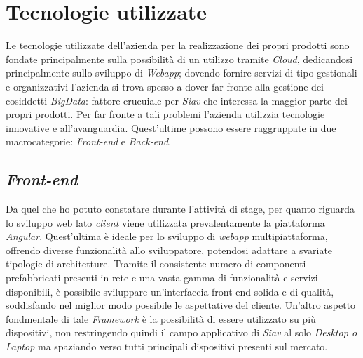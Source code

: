 \section {Tecnologie utilizzate}
Le tecnologie utilizzate dell'azienda per la realizzazione dei propri prodotti sono fondate principalmente sulla possibilità di un utilizzo tramite \textit{\gls{Cloud}}, dedicandosi principalmente sullo sviluppo di \textit{Webapp}; dovendo fornire servizi di tipo gestionali e organizzativi l'azienda si trova spesso a dover far fronte alla gestione dei cosiddetti \textit{\gls{BigData}}: fattore crucuiale per \textit{Siav} che interessa la maggior parte dei propri prodotti. Per far fronte a tali problemi l'azienda utilizzia tecnologie innovative e all'avanguardia. Quest'ultime possono essere raggruppate in due macrocategorie: \textit{Front-end} e \textit{Back-end}.
\subsection{\textit{Front-end}}
Da quel che ho potuto constatare durante l'attività di stage, per quanto riguarda lo sviluppo web lato \textit{client} viene utilizzata prevalentamente la piattaforma \textit{\gls{Angular}}.
Quest'ultima è ideale per lo sviluppo di \textit{webapp} multipiattaforma, offrendo diverse funzionalità allo sviluppatore, potendosi adattare a svariate tipologie di architetture.
 Tramite il consistente numero di componenti prefabbricati presenti in rete e una vasta gamma di funzionalità e servizi disponibili, è possibile sviluppare un'interfaccia front-end solida e di qualità, soddisfando nel miglior modo possibile le aspettative del cliente. Un'altro aspetto fondmentale di tale \textit{\gls{Framework}} è la possibilità di essere utilizzato su più dispositivi, non restringendo quindi il campo applicativo di \textit{Siav} al solo \textit{Desktop o Laptop} ma spaziando verso tutti principali dispositivi presenti sul mercato.

